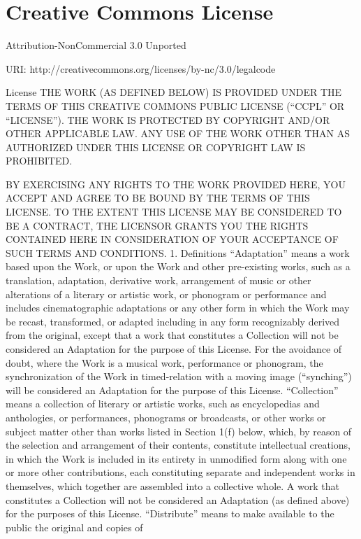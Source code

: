\documentclass[oneside]{book}
\begin{document}
\chapter{Creative Commons License}

Attribution-NonCommercial 3.0 Unported

URI:  http://creativecommons.org/licenses/by-nc/3.0/legalcode

License
THE WORK (AS DEFINED BELOW) IS PROVIDED UNDER THE TERMS OF THIS CREATIVE COMMONS
PUBLIC LICENSE (``CCPL'' OR ``LICENSE''). THE WORK IS PROTECTED BY COPYRIGHT
AND/OR OTHER APPLICABLE LAW. ANY USE OF THE WORK OTHER THAN AS AUTHORIZED UNDER
THIS LICENSE OR COPYRIGHT LAW IS PROHIBITED.

BY EXERCISING ANY RIGHTS TO THE WORK PROVIDED HERE, YOU ACCEPT AND AGREE TO BE
BOUND BY THE TERMS OF THIS LICENSE. TO THE EXTENT THIS LICENSE MAY BE CONSIDERED
TO BE A CONTRACT, THE LICENSOR GRANTS YOU THE RIGHTS CONTAINED HERE IN
CONSIDERATION OF YOUR ACCEPTANCE OF SUCH TERMS AND CONDITIONS.
1. Definitions
``Adaptation'' means a work based upon the Work, or upon the Work and other
pre-existing works, such as a translation, adaptation, derivative work,
arrangement of music or other alterations of a literary or artistic work, or
phonogram or performance and includes cinematographic adaptations or any other
form in which the Work may be recast, transformed, or adapted including in any
form recognizably derived from the original, except that a work that constitutes
a Collection will not be considered an Adaptation for the purpose of this
License. For the avoidance of doubt, where the Work is a musical work,
performance or phonogram, the synchronization of the Work in timed-relation with
a moving image (``synching'') will be considered an Adaptation for the purpose
of this License.
``Collection'' means a collection of literary or artistic works, such as
encyclopedias and anthologies, or performances, phonograms or broadcasts, or
other works or subject matter other than works listed in Section 1(f) below,
which, by reason of the selection and arrangement of their contents, constitute
intellectual creations, in which the Work is included in its entirety in
unmodified form along with one or more other contributions, each constituting
separate and independent works in themselves, which together are assembled into
a collective whole. A work that constitutes a Collection will not be considered
an Adaptation (as defined above) for the purposes of this License.
``Distribute'' means to make available to the public the original and copies of
\end{document}
